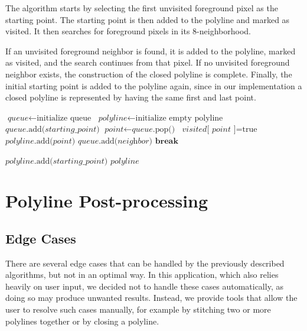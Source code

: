 The algorithm starts by selecting the first unvisited foreground pixel as the starting point. The starting point is then added to the polyline and marked as visited. It then searches for foreground pixels in its 8-neighborhood. 

If an unvisited foreground neighbor is found, it is added to the polyline, marked as visited, and the search continues from that pixel. If no unvisited foreground neighbor exists, the construction of the closed polyline is complete. Finally, the initial starting point is added to the polyline again, since in our implementation a closed polyline is represented by having the same first and last point.

{
	\begin{algorithmic}[1]
		\State $\textit{queue} \gets \text{initialize queue}$
		\State $\textit{polyline} \gets \text{initialize empty polyline}$
		\State
		\State $\textit{queue}\text{.add(}\textit{starting\_point}\text{)}$
		\State $\textit{point} \gets \textit{queue}\text{.pop()}$ 
		\State
		\State $\textit{visited}\text{[}\textit{ point }\text{]} = \text{true}$
		\State $\textit{polyline}\text{.add(}\textit{point}\text{)}$
		\State
		\State $\textit{queue}\text{.add(}\textit{neighbor}\text{)}$
		\State $\textbf{break}$
		\EndIf
		\EndFor
		\EndWhile
		
		\State
		\State $\textit{polyline}\text{.add(}\textit{starting\_point}\text{)}$
		\State 
		\Return $\textit{polyline}$
		\EndProcedure
	\end{algorithmic}
}


\section{Polyline Post-processing}

\subsection{Edge Cases}

There are several edge cases that can be handled by the previously described algorithms, but not in an optimal way. In this application, which also relies heavily on user input, we decided not to handle these cases automatically, as doing so may produce unwanted results. Instead, we provide tools that allow the user to resolve such cases manually, for example by stitching two or more polylines together or by closing a polyline.


